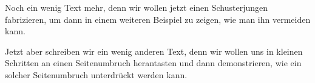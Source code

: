 \documentclass[a5paper]{article}
\begin{document}

\blindtext

\blindtext Noch ein wenig Text mehr, denn wir wollen jetzt einen Schusterjungen fabrizieren, um dann in einem weiteren
Beispiel zu zeigen, wie man ihn vermeiden kann.

Jetzt aber schreiben wir ein wenig anderen Text, denn wir wollen uns in kleinen Schritten an einen
Seitenumbruch herantasten und dann demonstrieren, wie ein solcher Seitenumbruch unterdrückt werden kann.
\end{document}
